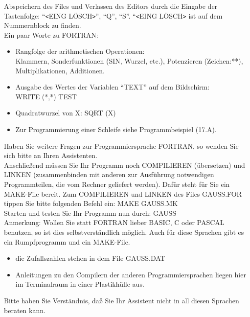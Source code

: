 \begin{enumerate}
Abspeichern des Files und Verlassen des Editors durch die Eingabe der
Tastenfolge: ``\verb|<|EING LÖSCH\verb|>|'', ``Q'',
``S''. ``\verb|<|EING LÖSCH\verb|>| ist auf dem Nummernblock zu finden.\\

Ein paar Worte zu FORTRAN:
\begin{itemize}
  \item Rangfolge der arithmetischen Operationen:\\
    Klammern, Sonderfunktionen (SIN, Wurzel, etc.), Potenzieren
    (Zeichen:**), Multiplikationen, Additionen.
  \item Ausgabe des Wertes der Variablen ``TEXT'' auf dem Bildschirm:\\
    WRITE (*,*) TEST
  \item Quadratwurzel von X: SQRT (X)
  \item Zur Programmierung einer Schleife siehe Programmbeispiel (17.A).
\end{itemize}

Haben Sie weitere Fragen zur Programmiersprache FORTRAN, so wenden Sie
sich bitte an Ihren Assistenten.\\

Anschließend müssen Sie Ihr Programm noch COMPILIEREN (übersetzen) und
LINKEN (zusammenbinden mit anderen zur Ausführung notwendigen
Programmteilen, die vom Rechner geliefert werden). Dafür steht für Sie
ein MAKE-File bereit. Zum COMPILIEREN und LINKEN des Files GAUSS.FOR
tippen Sie bitte folgenden Befehl ein: MAKE GAUSS.MK\\

Starten und testen Sie Ihr Programm nun durch: GAUSS\\

Anmerkung: Wollen Sie statt FORTRAN lieber BASIC, C oder PASCAL
benutzen, so ist dies selbstverständlich möglich. Auch für diese
Sprachen gibt es ein Rumpfprogramm und ein MAKE-File.

\begin{itemize}
  \item die Zufallszahlen stehen in dem File GAUSS.DAT
  \item Anleitungen zu den Compilern der anderen Programmiersprachen liegen
    hier im Terminalraum in einer Plastikhülle aus.
\end{itemize}

Bitte haben Sie Verständnis, daß Sie Ihr Assistent nicht in all diesen
Sprachen beraten kann.\\

\end{enumerate}



